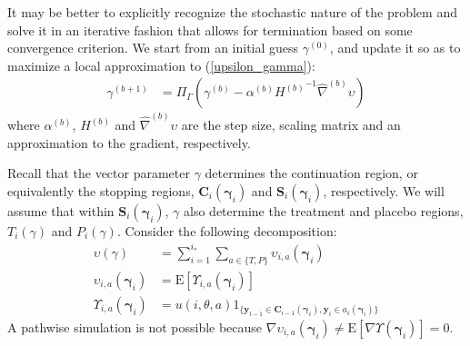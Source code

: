\documentclass[11pt]{article}
\begin{document}
It may be better to explicitly recognize the stochastic nature of the problem and solve it in an iterative fashion that allows for termination based on some convergence criterion. We start from an initial guess $\gamma^{(0)}$, and update it so as to maximize a local approximation to (\ref{upsilon_gamma}):
\begin{align}\label{newt_iter}
\gamma^{(b+1)}&=\Pi_{\Gamma}(\gamma^{(b)}-\alpha^{(b)}{H^{(b)}}^{-1}\hat\nabla^{(b)}\upsilon)
\end{align}where $\alpha^{(b)}$, $H^{(b)}$ and $\hat \nabla^{(b)}\upsilon$ are the step size, scaling matrix and an approximation to the gradient, respectively.

Recall that the vector parameter $\gamma$ determines the continuation region, or equivalently the stopping regions, $\mathbf{C}_i(\boldsymbol{\gamma}_i)$ and $\mathbf{S}_i(\boldsymbol{\gamma}_i)$, respectively. We will assume that within $\mathbf{S}_i(\boldsymbol{\gamma}_i)$, $\gamma$ also determine the treatment and placebo regions, $T_i(\gamma)$ and $P_i(\gamma)$. Consider the following decomposition:
\begin{align}\label{upsilon_gamma_decomp}
\upsilon(\gamma)&=\sum_{i=1}^{i_*} \sum_{a\in \{T,P\}}\upsilon_{i,a}(\boldsymbol{\gamma}_i)\\
\label{upsilon_i_a}
\upsilon_{i,a}(\boldsymbol{\gamma}_i)&=\mathrm{E}[\Upsilon_{i,a}(\boldsymbol{\gamma}_i)]\\
\Upsilon_{i,a}(\boldsymbol{\gamma}_i)&=u(i,\theta,a)1_{\{\mathbf{y}_{i-1}\in\mathbf{C}_{i-1}(\boldsymbol{\gamma}_i),\mathbf{y}_i\in a_i(\boldsymbol\gamma_i)\}}
\end{align}A pathwise simulation is not possible because $\nabla \upsilon_{i,a}(\boldsymbol{\gamma}_i)\neq\mathrm{E}[\nabla\Upsilon(\boldsymbol{\gamma}_i)]=0$.
\end{document}
